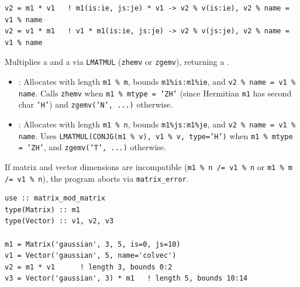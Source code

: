 

\lstset{language=[95]Fortran}
\begin{lstlisting}
v2 = m1 * v1   ! m1(is:ie, js:je) * v1 -> v2 % v(is:ie), v2 % name = v1 % name
v2 = v1 * m1   ! v1 * m1(is:ie, js:je) -> v2 % v(js:je), v2 % name = v1 % name
\end{lstlisting}

Multiplies a   and a   via \texttt{LMATMUL} (\texttt{zhemv} or \texttt{zgemv}), returning a .

\begin{itemize}
  \item {}: Allocates  with length \texttt{m1 \% m}, bounds \texttt{m1\%is:m1\%ie}, and \texttt{v2 \% name = v1 \% name}. Calls \texttt{zhemv} when \texttt{m1 \% mtype = 'ZH'} (since Hermitian \texttt{m1} has second char \texttt{'H'}) and \texttt{zgemv('N', ...)} otherwise.
  \item {}: Allocates  with length \texttt{m1 \% n}, bounds \texttt{m1\%js:m1\%je}, and \texttt{v2 \% name = v1 \% name}. Uses \texttt{LMATMUL(CONJG(m1 \% v), v1 \% v, type='H')} when \texttt{m1 \% mtype = 'ZH'}, and \texttt{zgemv('T', ...)} otherwise.
\end{itemize}
If matrix and vector dimensions are incompatible (\texttt{m1 \% n /= v1 \% n} or \texttt{m1 \% m /= v1 \% n}), the program aborts via \texttt{matrix\_error}.

\begin{description}[leftmargin=2.2cm, style=nextline]
\end{description}

\lstset{language=[95]Fortran}
\begin{lstlisting}
use :: matrix_mod_matrix
type(Matrix) :: m1
type(Vector) :: v1, v2, v3

m1 = Matrix('gaussian', 3, 5, is=0, js=10)
v1 = Vector('gaussian', 5, name='colvec')
v2 = m1 * v1      ! length 3, bounds 0:2
v3 = Vector('gaussian', 3) * m1   ! length 5, bounds 10:14
\end{lstlisting}

